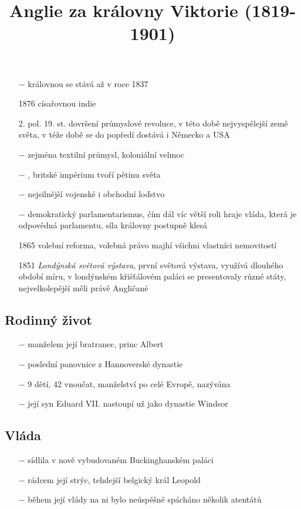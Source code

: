 \documentclass{article}
\title{\vspace{-2cm}Anglie za královny Viktorie (1819-1901)\vspace{-1.7cm}}
\date{}
\author{}
\begin{document}
\maketitle

\begin{itemize}
    \vspace{-0.5em}
    \setlength\itemsep{0.15em}
    \item[$-$] královnou se stává až v roce 1837
    \item[1876] císařovnou indie
    \item[2. pol. 19. st.] dovršení průmyslové revoluce, v této době nejvyspělejší země světa, v téže době se do popředí dostává i Německo a USA
    \item[$-$] zejména textilní průmysl, koloniální velmoc
    \item[$-$] , britské impérium tvoří pětinu světa
    \item[$-$] nejsilnější vojenské i obchodní loďstvo
    \item[$-$] demokratický parlamentarismus, čím dál víc větší roli hraje vláda, která je odpovědná parlamentu, síla královny postupně klesá
    \item[1865] volební reforma, volebná právo majhí všichni vlastníci nemovitostí
    \item[1851] \textit{Londýnská světová výstava}, první světová výstava, využívá dlouhého období míru, v londýnském křišťálovém paláci se presentovaly různé státy, nejvelkolepější měli právě Angličané
\end{itemize}

\subsection*{Rodinný život}
\begin{itemize}
    \vspace{-0.5em}
    \setlength\itemsep{0.15em}
    \item[$-$] manželem její bratranec, princ Albert
    \item[$-$] poslední panovnice z Hannoverské dynastie
    \item[$-$] 9 dětí, 42 vnoučat, manželství po celé Evropě, nazývána 
    \item[$-$] její syn Eduard VII. nastoupí už jako dynastie Windsor
\end{itemize}

\subsection*{Vláda}
\begin{itemize}
    \vspace{-0.5em}
    \setlength\itemsep{0.15em}
    \item[$-$] sídlila v nově vybudovaném Buckinghanském paláci
    \item[$-$] rádcem její strýc, tehdejší belgický král Leopold
    \item[$-$] během její vlády na ni bylo neúspěšně spácháno několik atentátů
\end{itemize}
\end{document}
